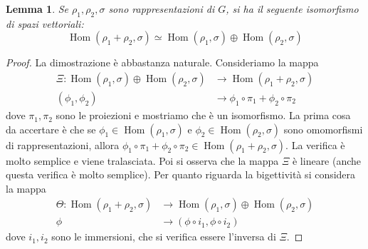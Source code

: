 \documentclass[11pt]{article}
\theoremstyle{plain}
\newtheorem{lemma}[thm]{Lemma}
\theoremstyle{definition}
\theoremstyle{remark}
\DeclareMathOperator{\Hom}{Hom}
\DeclareMathOperator{\iso}{\simeq}
\begin{document}
\begin{lemma}
Se $\rho_1, \rho_2, \sigma$ sono rappresentazioni di $G$, si ha il seguente isomorfismo di spazi vettoriali:
\[\Hom(\rho_1 + \rho_2, \sigma) \iso \Hom(\rho_1, \sigma) \oplus \Hom(\rho_2, \sigma)\]
\end{lemma}
\begin{proof}
La dimostrazione è abbastanza naturale. Consideriamo la mappa
\begin{align*}
\Xi :  \Hom(\rho_1, \sigma) \oplus \Hom(\rho_2, \sigma) &\to \Hom(\rho_1 + \rho_2, \sigma) \\
(\phi_1 , \phi_2)                                       &\to \phi_1\circ\pi_1 + \phi_2\circ\pi_2
\end{align*}
dove $\pi_1,\pi_2$ sono le proiezioni e mostriamo che è un isomorfismo.
La prima cosa da accertare è che se $\phi_1\in \Hom(\rho_1, \sigma)$ e $\phi_2\in \Hom(\rho_2, \sigma)$ sono omomorfismi di rappresentazioni, allora
$\phi_1\circ\pi_1 + \phi_2\circ\pi_2 \in \Hom(\rho_1 + \rho_2, \sigma)$. La verifica è molto semplice e viene tralasciata.\newline
Poi si osserva che la mappa $\Xi$ è lineare (anche questa verifica è molto semplice).\newline
Per quanto riguarda la bigettività si considera la mappa
\begin{align*}
\Theta:\Hom(\rho_1 + \rho_2, \sigma) &\to \Hom(\rho_1, \sigma) \oplus \Hom(\rho_2, \sigma) \\
\phi								   &\to (\phi\circ i_1, \phi\circ i_2)
\end{align*}
dove $i_1, i_2$ sono le immersioni, che si verifica essere l'inversa di $\Xi$.
\end{proof}
\end{document}
